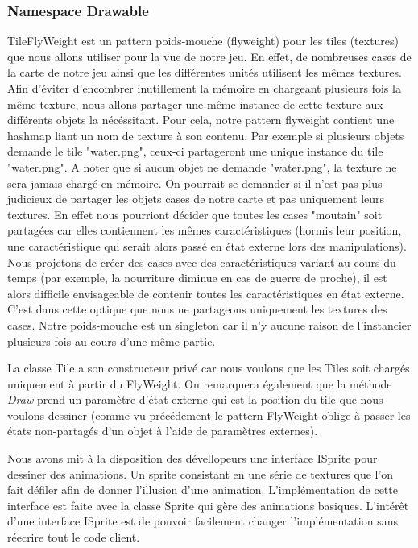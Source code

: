 		\subsubsection{Namespace Drawable} 
			TileFlyWeight est un pattern poids-mouche (flyweight) pour les tiles (textures) que nous allons utiliser pour la vue de notre jeu.
		En effet, de nombreuses cases de la carte de notre jeu ainsi que les différentes unités utilisent les mêmes textures. Afin d'éviter d'encombrer
		inutillement la mémoire en chargeant plusieurs fois la même texture, nous allons partager une même instance de cette texture aux différents objets la nécéssitant.
		Pour cela, notre pattern flyweight contient une hashmap liant un nom de texture à son contenu. 
		Par exemple si plusieurs objets demande le tile "water.png", ceux-ci partageront une unique instance du tile "water.png". 
		A noter que si aucun objet ne demande "water.png", la texture ne sera jamais chargé en mémoire.
			On pourrait se demander si il n'est pas plus judicieux de partager les objets cases de notre carte et pas uniquement leurs textures. 
		En effet nous pourriont décider que toutes les cases "moutain" soit partagées car elles contiennent les mêmes caractéristiques 
		(hormis leur position, une caractéristique qui serait alors passé en état externe lors des manipulations).
			Nous projetons de créer des cases avec des caractéristiques variant au cours du temps (par exemple, la nourriture diminue en cas de guerre de proche), 
		il est alors difficile envisageable de contenir toutes les caractéristiques en état externe. C'est dans cette optique que nous ne partageons uniquement les textures des cases.
		Notre poids-mouche est un singleton car il n'y aucune raison de l'instancier plusieurs fois au cours d'une même partie.

		La classe Tile a son constructeur privé car nous voulons que les Tiles soit chargés uniquement à partir du FlyWeight. 
		On remarquera également que la méthode \textit{Draw} prend un paramètre d'état externe qui est la position du tile que nous voulons dessiner 
		(comme vu précédement le pattern FlyWeight oblige à passer les états non-partagés d'un objet à l'aide de paramètres externes).

		Nous avons mit à la disposition des dévellopeurs une interface ISprite pour dessiner des animations. Un sprite consistant en une série de textures que l'on fait défiler afin de donner l'illusion 
		d'une animation. L'implémentation de cette interface est faite avec la classe Sprite qui gère des animations basiques. L'intérêt d'une interface ISprite est de pouvoir facilement changer l'implémentation
		sans réecrire tout le code client.

